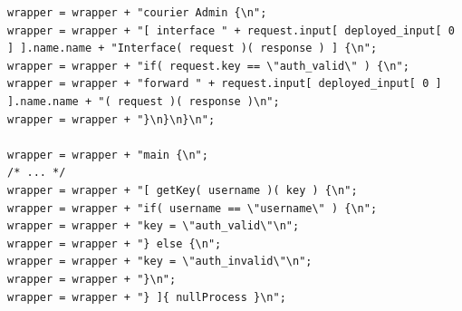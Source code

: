 \documentclass[12pt,a4paper]{article}
\begin{document}
\begin{lstlisting}[caption={Adding courier to service wrapper},label={lst:courierToWrapper}]
wrapper = wrapper + "courier Admin {\n";                                                                                                                                                         
wrapper = wrapper + "[ interface " + request.input[ deployed_input[ 0 ] ].name.name + "Interface( request )( response ) ] {\n";                                                                  
wrapper = wrapper + "if( request.key == \"auth_valid\" ) {\n";                                                                                                                                   
wrapper = wrapper + "forward " + request.input[ deployed_input[ 0 ] ].name.name + "( request )( response )\n";                                                                                   
wrapper = wrapper + "}\n}\n}\n";

wrapper = wrapper + "main {\n";                                                                                                                                                                  
/* ... */
wrapper = wrapper + "[ getKey( username )( key ) {\n";                                                                                                                                           
wrapper = wrapper + "if( username == \"username\" ) {\n";
wrapper = wrapper + "key = \"auth_valid\"\n";                                                                                                                                                    
wrapper = wrapper + "} else {\n";                                                                                                                                                                
wrapper = wrapper + "key = \"auth_invalid\"\n";                                                                                                                                                  
wrapper = wrapper + "}\n";                                                                                                                                                                       
wrapper = wrapper + "} ]{ nullProcess }\n";
\end{lstlisting}
\end{document}
